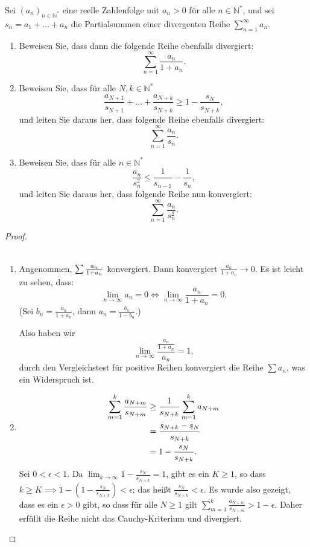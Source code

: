 \documentclass{../problemset}
\begin{document}
\begin{problem}
Sei $(a_n)_{n\in\mathbb{N}^*}$ eine reelle Zahlenfolge mit $a_n > 0$ für alle $n \in \mathbb{N}^*$, und sei $s_n = a_1 + \ldots + a_n$ die Partialsummen einer divergenten Reihe $\sum_{n=1}^{\infty} a_n$.
\begin{enumerate}
	\item Beweisen Sie, dass dann die folgende Reihe ebenfalls divergiert:
	      \[
		      \sum_{n=1}^{\infty} \frac{a_n}{1 + a_n}.
	      \]
	\item Beweisen Sie, dass für alle $N, k \in \mathbb{N}^*$
	      \[
		      \frac{a_{N+1}}{s_{N+1}} + \ldots + \frac{a_{N+k}}{s_{N+k}} \geq 1 - \frac{s_N}{s_{N+k}},
	      \]
	      und leiten Sie daraus her, dass folgende Reihe ebenfalls divergiert:
	      \[
		      \sum_{n=1}^{\infty} \frac{a_n}{s_n}.
	      \]
	\item Beweisen Sie, dass für alle $n \in \mathbb{N}^*$
	      \[
		      \frac{a_n}{s_n^2} \leq \frac{1}{s_{n-1}} - \frac{1}{s_n},
	      \]
	      und leiten Sie daraus her, dass folgende Reihe nun konvergiert:
	      \[
		      \sum_{n=1}^{\infty} \frac{a_n}{s_n^2}.
	      \]
\end{enumerate}
\begin{proof}
	\\\
	\begin{enumerate}
		\item Angenommen, $\sum{a_n\over 1+{a_n}}$ konvergiert.
		      Dann konvergiert $\frac{a_n}{1+a_n}\to 0$.
		      Es ist leicht zu sehen, dass: \[
			      \lim_{n\to\infty}a_n=0\iff \lim_{n\to\infty}\frac{a_n}{1+a_n}=0.
		      \]
		      (Sei $b_n=\frac{a_n}{1+a_n}$, dann $a_n=\frac{b_n}{1-b_n}$.)

		      Also haben wir \[
			      \lim_{n\to\infty}\frac{\frac{a_n}{1+a_n}}{a_n}=1,
		      \]
		      durch den Vergleichstest für positive Reihen konvergiert die Reihe $\sum a_n$, was ein Widerspruch ist.
		      \checkmark
		\item \begin{align}
			      \sum_{m=1}^k\frac{a_{N+m}}{s_{N+m}} & \ge\frac{1}{s_{N+k}}\sum_{m=1}^ka_{N+m} \\
			                                          & ={s_{N+k}-s_N\over s_{N+k}}             \\
			                                          & = 1-\frac{s_N}{s_{N+k}}.
		      \end{align}
		      Sei $0<\epsilon<1$. Da $\lim_{k\to\infty}1-\frac{s_N}{s_{N+k}}=1$, gibt es ein $K\ge 1$, so dass $k\ge K\implies 1-\left(1-\frac{s_N}{s_{N+k}}\right)<\epsilon$; das heißt $\frac{s_N}{s_{N+k}}<\epsilon$.
		      Es wurde also gezeigt, dass es ein $\epsilon>0$ gibt, so dass für alle $N\ge 1$ gilt $\sum_{m=1}^k\frac{a_{N+m}}{s_{N+m}}>1-\epsilon$.
		      Daher erfüllt die Reihe nicht das Cauchy-Kriterium und divergiert.
		      \checkmark


\end{enumerate}
\end{proof}
\end{problem}
\end{document}
